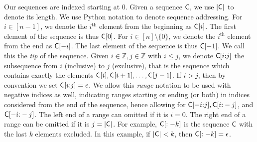 Our sequences are indexed starting at $0$. Given a sequence $\mathsf{C}$, we use
$|\mathsf{C}|$ to denote its length. We use Python notation to denote sequence
addressing. For $i \in [n - 1]$, we denote the $i^\text{th}$ element from the
beginning as $\mathsf{C}[i]$. The first element of the sequence is thus $\mathsf{C}[0]$.
For $i \in [n] \setminus \{0\}$, we denote the $i^\text{th}$ element from the
end as $\mathsf{C}[-i]$. The last element of the sequence is thus $\mathsf{C}[-1]$. We
call this the \emph{tip} of the sequence. Given $i \in \mathbb{Z},
j \in \mathbb{Z}$ with $i \leq j$, we denote $\mathsf{C}[i{:}j]$ the subsequence from
$i$ (inclusive) to $j$ (exclusive), that is the sequence which contains exactly
the elements $\mathsf{C}[i], \mathsf{C}[i + 1], \dots, \mathsf{C}[j - 1]$. If $i > j$, then
by convention we set $\mathsf{C}[i{:}j] = \epsilon$. We allow this \emph{range}
notation to be used with negative indices as well, indicating ranges starting or
ending (or both) in indices considered from the end of the sequence, hence
allowing for $\mathsf{C}[-i{:}j], \mathsf{C}[i{:}-j]$, and $\mathsf{C}[-i{:}-j]$. The left end of
a range can omitted if it is $i = 0$. The right end of a range can be omitted if
it is $j = |\mathsf{C}|$. For example, $\mathsf{C}[:-k]$ is the sequence $\mathsf{C}$ with
the last $k$ elements excluded. In this example, if $|\mathsf{C}| < k$, then
$\mathsf{C}[:-k] = \epsilon$.

